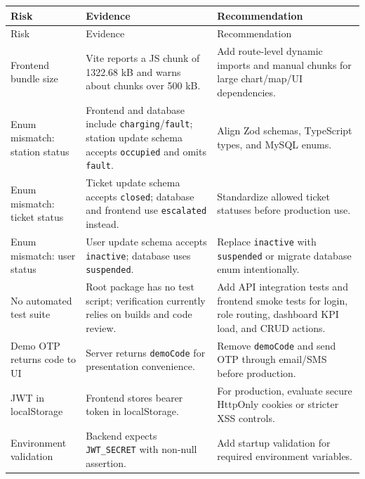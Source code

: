\documentclass[12pt,a4paper]{report}
\begin{document}
\begin{longtable}{p{4.2cm}p{5.5cm}p{4.3cm}}
\toprule
Risk & Evidence & Recommendation \\
\midrule
\endfirsthead
\toprule
Risk & Evidence & Recommendation \\
\midrule
\endhead
\bottomrule
\endfoot

Frontend bundle size & Vite reports a JS chunk of 1322.68 kB and warns about chunks over 500 kB. & Add route-level dynamic imports and manual chunks for large chart/map/UI dependencies. \\

Enum mismatch: station status & Frontend and database include \texttt{charging}/\texttt{fault}; station update schema accepts \texttt{occupied} and omits \texttt{fault}. & Align Zod schemas, TypeScript types, and MySQL enums. \\

Enum mismatch: ticket status & Ticket update schema accepts \texttt{closed}; database and frontend use \texttt{escalated} instead. & Standardize allowed ticket statuses before production use. \\

Enum mismatch: user status & User update schema accepts \texttt{inactive}; database uses \texttt{suspended}. & Replace \texttt{inactive} with \texttt{suspended} or migrate database enum intentionally. \\

No automated test suite & Root package has no test script; verification currently relies on builds and code review. & Add API integration tests and frontend smoke tests for login, role routing, dashboard KPI load, and CRUD actions. \\

Demo OTP returns code to UI & Server returns \texttt{demoCode} for presentation convenience. & Remove \texttt{demoCode} and send OTP through email/SMS before production. \\

JWT in localStorage & Frontend stores bearer token in localStorage. & For production, evaluate secure HttpOnly cookies or stricter XSS controls. \\

Environment validation & Backend expects \texttt{JWT\_SECRET} with non-null assertion. & Add startup validation for required environment variables. \\

\end{longtable}
\end{document}
